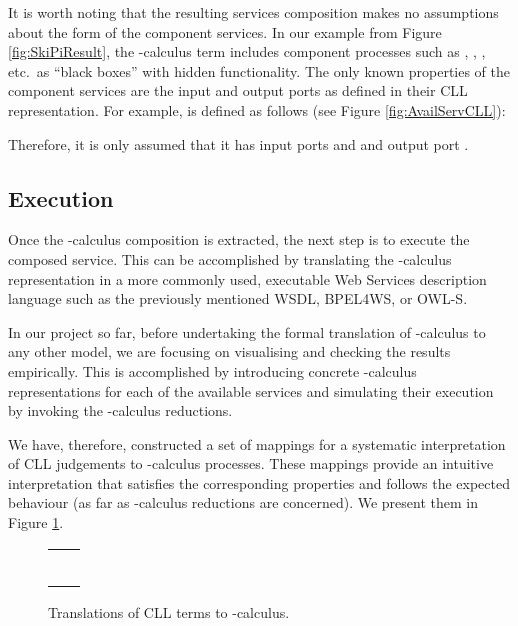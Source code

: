\documentclass[copyright,creativecommons]{eptcs}
\begin{document}
It is worth noting that the resulting services composition makes no assumptions about the form of the component services. In our example from Figure \ref{fig:SkiPiResult}, the -calculus term includes component processes such as , , , etc.\ as ``black boxes'' with hidden functionality. The only known properties of the component services are the input and output ports as defined in their CLL representation. For example,  is defined as follows (see Figure \ref{fig:AvailServCLL}):

Therefore, it is only assumed that it has input ports  and  and output port .


\subsection{Execution}
\label{execution}

Once the -calculus composition is extracted, the next step is to execute the composed service. This can be accomplished by translating the -calculus representation in a more commonly used, executable Web Services description language such as the previously mentioned WSDL, BPEL4WS, or OWL-S. 

In our project so far, before undertaking the formal translation of -calculus to any other model, we are focusing on visualising and checking the results empirically. This is accomplished by introducing concrete -calculus representations for each of the available services and simulating their execution by invoking the -calculus reductions.

We have, therefore, constructed a set of mappings for a systematic interpretation of CLL judgements to -calculus processes. These mappings provide an intuitive interpretation that satisfies the corresponding properties and follows the expected behaviour (as far as -calculus reductions are concerned). We present them in Figure \ref{proctrans}.

\begin{figure}[htbp]
	\centering
		\begin{tabular}{rl}
			 &  \\
			 &  \\
			 &  \\
			 & \\
			 &  \\
			 & \\
		\end{tabular}
			\caption{Translations of CLL terms to -calculus.}
			\label{proctrans}
\end{figure}
\end{document}
